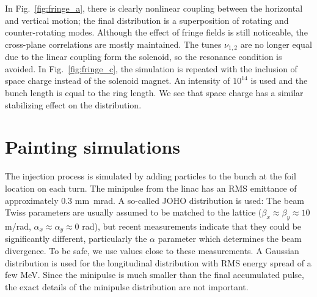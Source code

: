 %

In Fig.~\ref{fig:fringe_a}, there is clearly nonlinear coupling between the horizontal and vertical motion; the final distribution is a superposition of rotating and counter-rotating modes. Although the effect of fringe fields is still noticeable, the cross-plane correlations are mostly maintained. The tunes $\nu_{1, 2}$ are no longer equal due to the linear coupling form the solenoid, so the resonance condition is avoided. In Fig.~\ref{fig:fringe_c}, the simulation is repeated with the inclusion of space charge instead of the solenoid magnet. An intensity of $10^{14}$ is used and the bunch length is equal to the ring length. We see that space charge has a similar stabilizing effect on the distribution.


\section{Painting simulations}

The injection process is simulated by adding particles to the bunch at the foil location on each turn. The minipulse from the linac has an RMS emittance of approximately 0.3 mm~mrad. A so-called JOHO distribution is used:
%
%
The beam Twiss parameters are usually assumed to be matched to the lattice ($\beta_x \approx \beta_y \approx 10$ m/rad, $\alpha_x \approx \alpha_y \approx 0$ rad), but recent measurements indicate that they could be significantly different, particularly the $\alpha$ parameter which determines the beam divergence. To be safe, we use values close to these measurements. A Gaussian distribution is used for the longitudinal distribution with RMS energy spread of a few MeV. Since the minipulse is much smaller than the final accumulated pulse, the exact details of the minipulse distribution are not important.


